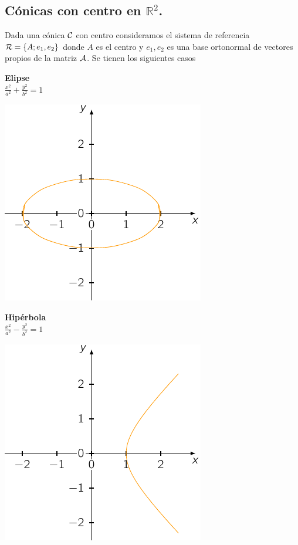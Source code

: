 \subsection{\bf  C\'onicas con centro en $\mathbb{R}^2$.}

\vspace{.5cm}

Dada una c\'onica $\cal C$ con centro consideramos el sistema de referencia
${\cal R}=\{A; e_1,e_2\}$ donde $A$
es el centro y $e_1,e_2$ es una base ortonormal de vectores propios de la matriz $\cal A$. Se tienen los siguientes casos

\begin{minipage}[c]{0.45\textwidth}
  {\bf Elipse}\vspace{1em}\\
  $\displaystyle \frac{{x}^2}{a^2} + \frac{{y}^2}{b^2} = 1$
\end{minipage}\hfill
\begin{minipage}[]{0.35\textwidth}
\includegraphics{./img/elip.pdf}
\end{minipage}

\begin{minipage}[c]{0.45\textwidth}
  {\bf Hipérbola}\vspace{1em}\\
  $\displaystyle \frac{{x}^2}{a^2} - \frac{{y}^2}{b^2} = 1$
\end{minipage}\hfill
\begin{minipage}[]{0.35\textwidth}
\includegraphics{./img/hipe.pdf}
\end{minipage}



